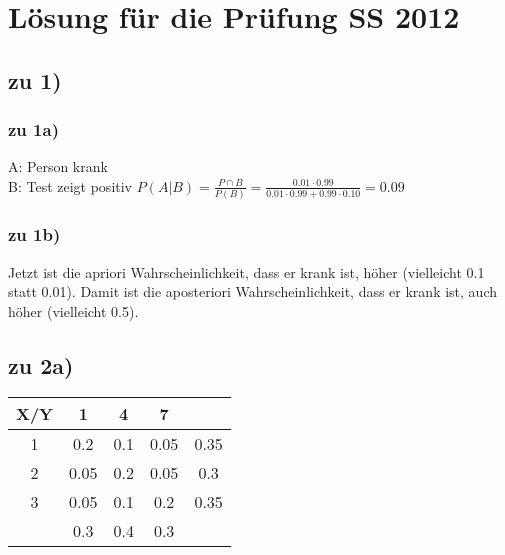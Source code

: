 

\section{Lösung für die Prüfung SS 2012}

\subsection{zu 1)}

\subsubsection{zu 1a)}
A: Person krank\\
B: Test zeigt positiv
$P(A|B) = \frac{P\cap B}{P(B)} = \frac{0.01\cdot 0.99}{0.01\cdot 0.99 + 0.99\cdot 0.10} = 0.09$

\subsubsection{zu 1b)}
Jetzt ist die apriori Wahrscheinlichkeit, dass er krank ist, höher (vielleicht 0.1 statt 0.01). Damit ist die aposteriori Wahrscheinlichkeit, dass er krank ist, auch höher (vielleicht 0.5). 

\subsection{zu 2a)}

\begin{tabular}{|c|c|c|c|c|}
\hline X/Y & 1 & 4 & 7 &  \\ 
\hline 1 & 0.2 & 0.1 & 0.05 & 0.35 \\ 
\hline 2 & 0.05 & 0.2 & 0.05 & 0.3 \\ 
\hline 3 & 0.05 & 0.1 & 0.2 & 0.35 \\ 
\hline  & 0.3 & 0.4 & 0.3 &  \\ 
\hline 
\end{tabular} 

